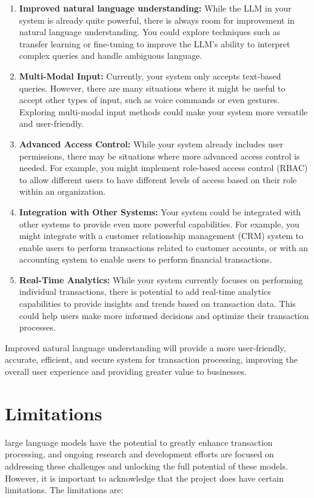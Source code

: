 \begin{enumerate}

\item \textbf{Improved natural language understanding:}   While the LLM in your system is already quite powerful, there is always room for improvement in natural language understanding. You could explore techniques such as transfer learning or fine-tuning to improve the LLM's ability to interpret complex queries and handle ambiguous language.


\item \textbf{Multi-Modal Input:}   Currently, your system only accepts text-based queries. However, there are many situations where it might be useful to accept other types of input, such as voice commands or even gestures. Exploring multi-modal input methods could make your system more versatile and user-friendly.

\item \textbf{Advanced Access Control:} While your system already includes user permissions, there may be situations where more advanced access control is needed. For example, you might implement role-based access control (RBAC) to allow different users to have different levels of access based on their role within an organization.

\item \textbf{Integration with Other Systems: } Your system could be integrated with other systems to provide even more powerful capabilities. For example, you might integrate with a customer relationship management (CRM) system to enable users to perform transactions related to customer accounts, or with an accounting system to enable users to perform financial transactions.


\item \textbf{Real-Time Analytics:} While your system currently focuses on performing individual transactions, there is potential to add real-time analytics capabilities to provide insights and trends based on transaction data. This could help users make more informed decisions and optimize their transaction processes.



\end{enumerate}
Improved natural language understanding will provide a more user-friendly, accurate, efficient, and secure system for transaction processing, improving the overall user experience and providing greater value to businesses.

\section{Limitations}
large language models have the potential to greatly enhance transaction processing, and ongoing research and development efforts are focused on addressing these challenges and unlocking the full potential of these models.
However, it is important to acknowledge that the project does have certain limitations. The limitations are:

